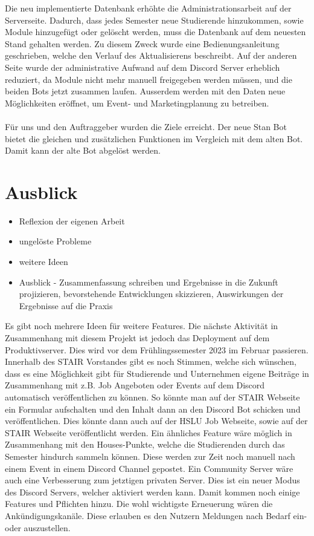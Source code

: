 \documentclass[a4paper, table]{article}
\begin{document}
Die neu implementierte Datenbank erhöhte die Administrationsarbeit auf der Serverseite. 
Dadurch, dass jedes Semester neue Studierende hinzukommen, sowie Module hinzugefügt oder gelöscht werden, muss die Datenbank auf dem neuesten Stand gehalten werden. 
Zu diesem Zweck wurde eine Bedienungsanleitung geschrieben, welche den Verlauf des Aktualisierens beschreibt. 
Auf der anderen Seite wurde der administrative Aufwand auf dem Discord Server erheblich reduziert, da Module nicht mehr manuell freigegeben werden müssen, und die beiden Bots jetzt zusammen laufen. 
Ausserdem werden mit den Daten neue Möglichkeiten eröffnet, um Event- und Marketingplanung zu betreiben.\\\\
Für uns und den Auftraggeber wurden die Ziele erreicht. 
Der neue Stan Bot bietet die gleichen und zusätzlichen Funktionen im Vergleich mit dem alten Bot. 
Damit kann der alte Bot abgelöst werden.

\newpage
\section{Ausblick}

\begin{itemize}
    \item Reflexion der eigenen Arbeit
    \item ungelöste Probleme
    \item weitere Ideen
    \item Ausblick - Zusammenfassung schreiben und Ergebnisse in die Zukunft projizieren, bevorstehende Entwicklungen skizzieren, Auswirkungen der Ergebnisse auf die Praxis
\end{itemize}

Es gibt noch mehrere Ideen für weitere Features.
Die nächste Aktivität in Zusammenhang mit diesem Projekt ist jedoch das Deployment auf dem Produktivserver.
Dies wird vor dem Frühlingssemester 2023 im Februar passieren.
\newline
Innerhalb des STAIR Vorstandes gibt es noch Stimmen, welche sich wünschen, dass es eine Möglichkeit gibt für Studierende und Unternehmen eigene Beiträge in Zusammenhang mit \gls{z.B.} Job Angeboten oder Events auf dem Discord automatisch veröffentlichen zu können.
So könnte man auf der STAIR Webseite ein Formular aufschalten und den Inhalt dann an den Discord Bot schicken und veröffentlichen.
Dies könnte dann auch auf der HSLU Job Webseite, sowie auf der STAIR Webseite veröffentlicht werden.
\newline
Ein ähnliches Feature wäre möglich in Zusammenhang mit den Houses-Punkte, welche die Studierenden durch das Semester hindurch sammeln können.
Diese werden zur Zeit noch manuell nach einem Event in einem Discord Channel gepostet.
\newline
Ein Community Server wäre auch eine Verbesserung zum jetztigen privaten Server.
Dies ist ein neuer Modus des Discord Servers, welcher aktiviert werden kann.
Damit kommen noch einige Features und Pflichten hinzu.
Die wohl wichtigste Erneuerung wären die Ankündigungskanäle.
Diese erlauben es den Nutzern Meldungen nach Bedarf ein- oder auszustellen.\autocite{noauthor_richte_nodate}
\end{document}
